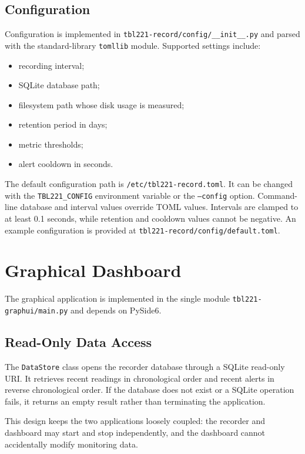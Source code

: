 \documentclass[11pt,a4paper]{article}
\begin{document}
\subsection{Configuration}

Configuration is implemented in \texttt{tbl221-record/config/\_\_init\_\_.py} and parsed with the standard-library \texttt{tomllib} module. Supported settings include:

\begin{itemize}
  \item recording interval;
  \item SQLite database path;
  \item filesystem path whose disk usage is measured;
  \item retention period in days;
  \item metric thresholds;
  \item alert cooldown in seconds.
\end{itemize}

The default configuration path is \texttt{/etc/tbl221-record.toml}. It can be changed with the \texttt{TBL221\_CONFIG} environment variable or the \texttt{--config} option. Command-line database and interval values override TOML values. Intervals are clamped to at least 0.1 seconds, while retention and cooldown values cannot be negative. An example configuration is provided at \texttt{tbl221-record/config/default.toml}.

\section{Graphical Dashboard}

The graphical application is implemented in the single module \texttt{tbl221-graphui/main.py} and depends on PySide6.

\subsection{Read-Only Data Access}

The \texttt{DataStore} class opens the recorder database through a SQLite read-only URI. It retrieves recent readings in chronological order and recent alerts in reverse chronological order. If the database does not exist or a SQLite operation fails, it returns an empty result rather than terminating the application.

This design keeps the two applications loosely coupled: the recorder and dashboard may start and stop independently, and the dashboard cannot accidentally modify monitoring data.
\end{document}
